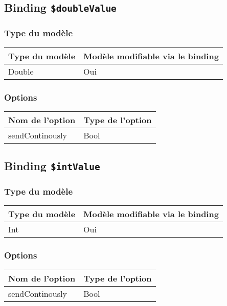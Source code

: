 \subsection{Binding \texttt{\$doubleValue}}

\subsubsection{Type du modèle}

\begin{tabular}{|l|l|}
\hline
\textbf{Type du modèle} & \textbf{Modèle modifiable via le binding}\\
\hline
Double & Oui\\
\hline
\end{tabular}
\subsubsection{Options}

\begin{tabular}{|l|l|}
\hline
\textbf{Nom de l'option} & \textbf{Type de l'option}\\
\hline
sendContinously & Bool\\
\hline
\end{tabular}
\subsection{Binding \texttt{\$intValue}}

\subsubsection{Type du modèle}

\begin{tabular}{|l|l|}
\hline
\textbf{Type du modèle} & \textbf{Modèle modifiable via le binding}\\
\hline
Int & Oui\\
\hline
\end{tabular}
\subsubsection{Options}

\begin{tabular}{|l|l|}
\hline
\textbf{Nom de l'option} & \textbf{Type de l'option}\\
\hline
sendContinously & Bool\\
\hline
\end{tabular}







